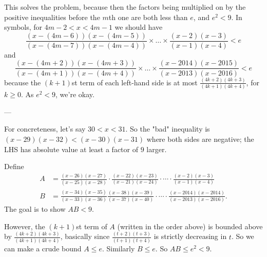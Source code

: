 This solves the problem, because then the factors being multiplied
on by the positive inequalities before the
$m$th one are both less than $e$, and $e^2 < 9$.
In symbols, for $4m-2 < x < 4m-1$ we should have
\[ \frac{(x-(4m-6))(x-(4m-5))}{(x-(4m-7))(x-(4m-4))}
  \times \dots \times \frac{(x-2)(x-3)}{(x-1)(x-4)} < e \]
and
\[ \frac{(x-(4m+2))(x-(4m+3))}{(x-(4m+1))(x-(4m+4))}
  \times \dots \times \frac{(x-2014)(x-2015)}{(x-2013)(x-2016)} < e \]
because the $(k+1)$st term of each left-hand side
is at most $\frac{(4k+2)(4k+3)}{(4k+1)(4k+4)}$, for $k \ge 0$.
As $e^2 < 9$, we're okay.

---

For concreteness, let's say $30 < x < 31$.
So the "bad" inequality is $(x-29)(x-32) < (x-30)(x-31)$
where both sides are negative;
the LHS has absolute value at least a factor of $9$ larger.

Define
\begin{align*}
  A &= \frac{(x-26)(x-27)}{(x-25)(x-28)}
    \cdot \frac{(x-22)(x-23)}{(x-21)(x-24)}
    \cdot \dotsb
    \cdot \frac{(x-2)(x-3)}{(x-1)(x-4)} \\
  B &= \frac{(x-34)(x-35)}{(x-33)(x-36)}
    \frac{(x-38)(x-39)}{(x-37)(x-40)}
    \cdot \dotsb
    \cdot \frac{(x-2014)(x-2014)}{(x-2013)(x-2016)}.
\end{align*}
The goal is to show $AB < 9$.

However, the $(k+1)$st term of $A$ (written in the order above)
is bounded above by $\frac{(4k+2)(4k+3)}{(4k+1)(4k+4)}$,
basically since $\frac{(t+2)(t+3)}{(t+1)(t+4)}$
is strictly decreasing in $t$.
So we can make a crude bound $A \le e$.
Similarly $B \le e$. So $AB \le e^2 < 9$.
